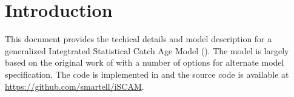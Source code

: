  	


\section{Introduction} %
\label{sec:introduction}

This document provides the techical details and model description for a generalized Integtrated Statistical Catch Age Model (\iscam).  The model is largely based on the original work of \citep{fournier1982general} with a number of options for alternate model specification. The code is implemented in \admb{} and the source code is available at \url{https://github.com/smartell/iSCAM}.

